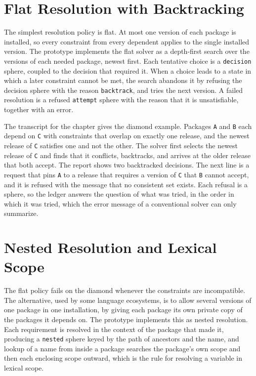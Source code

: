 \section{Flat Resolution with Backtracking}

The simplest resolution policy is flat. At most one version of each package is installed, so every constraint from every dependent applies to the single installed version. The prototype implements the flat solver as a depth-first search over the versions of each needed package, newest first. Each tentative choice is a \texttt{decision} sphere, coupled to the decision that required it. When a choice leads to a state in which a later constraint cannot be met, the search abandons it by refusing the decision sphere with the reason \texttt{backtrack}, and tries the next version. A failed resolution is a refused \texttt{attempt} sphere with the reason that it is unsatisfiable, together with an error.


The transcript for the chapter gives the diamond example. Packages \texttt{A} and \texttt{B} each depend on \texttt{C} with constraints that overlap on exactly one release, and the newest release of \texttt{C} satisfies one and not the other. The solver first selects the newest release of \texttt{C} and finds that it conflicts, backtracks, and arrives at the older release that both accept. The report shows two backtracked decisions. The next line is a request that pins \texttt{A} to a release that requires a version of \texttt{C} that \texttt{B} cannot accept, and it is refused with the message that no consistent set exists. Each refusal is a sphere, so the ledger answers the question of what was tried, in the order in which it was tried, which the error message of a conventional solver can only summarize.

\section{Nested Resolution and Lexical Scope}

The flat policy fails on the diamond whenever the constraints are incompatible. The alternative, used by some language ecosystems, is to allow several versions of one package in one installation, by giving each package its own private copy of the packages it depends on. The prototype implements this as nested resolution. Each requirement is resolved in the context of the package that made it, producing a \texttt{nested} sphere keyed by the path of ancestors and the name, and lookup of a name from inside a package searches the package's own scope and then each enclosing scope outward, which is the rule for resolving a variable in lexical scope.

